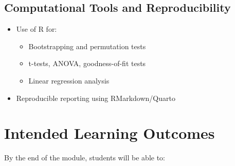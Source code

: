 \documentclass[
  a4paper,
  DIV=11,
  numbers=noendperiod,
  oneside]{scrreprt}
\providecommand{\tightlist}{%
  \setlength{\itemsep}{0pt}\setlength{\parskip}{0pt}}
\theoremstyle{definition}
\theoremstyle{definition}
\theoremstyle{plain}
\theoremstyle{plain}
\theoremstyle{definition}
\theoremstyle{remark}
\begin{document}
\subsection*{Computational Tools and
Reproducibility}\label{computational-tools-and-reproducibility}

\begin{itemize}
\tightlist
\item
  Use of R for:

  \begin{itemize}
  \tightlist
  \item
    Bootstrapping and permutation tests\\
  \item
    t-tests, ANOVA, goodness-of-fit tests\\
  \item
    Linear regression analysis\\
  \end{itemize}
\item
  Reproducible reporting using RMarkdown/Quarto
\end{itemize}

\section*{Intended Learning Outcomes}\label{intended-learning-outcomes}


By the end of the module, students will be able to:
\end{document}
